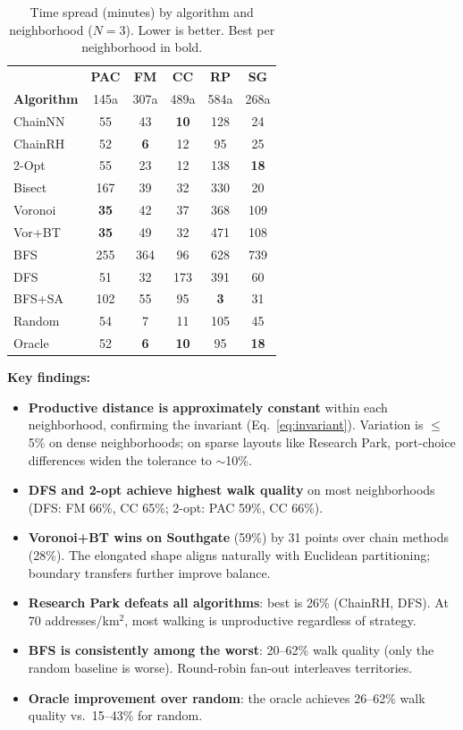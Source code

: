 \documentclass[conference]{IEEEtran}
\begin{document}
\begin{table}[htbp]
\caption{Time spread (minutes) by algorithm and neighborhood ($N=3$). Lower is better. Best per neighborhood in bold.}
\label{tab:spread-table}
\begin{center}
\begin{tabular}{l ccccc}
\toprule
 & \textbf{PAC} & \textbf{FM} & \textbf{CC} & \textbf{RP} & \textbf{SG} \\
\textbf{Algorithm} & 145a & 307a & 489a & 584a & 268a \\
\midrule
ChainNN  & 55 & 43 & \textbf{10} & 128 & 24 \\
ChainRH  & 52 & \textbf{6} & 12 & 95 & 25 \\
2-Opt    & 55 & 23 & 12 & 138 & \textbf{18} \\
Bisect   & 167 & 39 & 32 & 330 & 20 \\
Voronoi  & \textbf{35} & 42 & 37 & 368 & 109 \\
Vor+BT   & \textbf{35} & 49 & 32 & 471 & 108 \\
BFS      & 255 & 364 & 96 & 628 & 739 \\
DFS      & 51 & 32 & 173 & 391 & 60 \\
BFS+SA   & 102 & 55 & 95 & \textbf{3} & 31 \\
Random   & 54 & 7 & 11 & 105 & 45 \\
\midrule
Oracle   & 52 & \textbf{6} & \textbf{10} & 95 & \textbf{18} \\
\bottomrule
\end{tabular}
\end{center}
\end{table}

\textbf{Key findings:}
\begin{itemize}
\item \textbf{Productive distance is approximately constant} within each neighborhood, confirming the invariant (Eq.~\ref{eq:invariant}). Variation is $\leq$5\% on dense neighborhoods; on sparse layouts like Research Park, port-choice differences widen the tolerance to $\sim$10\%.
\item \textbf{DFS and 2-opt achieve highest walk quality} on most neighborhoods (DFS: FM 66\%, CC 65\%; 2-opt: PAC 59\%, CC 66\%).
\item \textbf{Voronoi+BT wins on Southgate} (59\%) by 31 points over chain methods (28\%). The elongated shape aligns naturally with Euclidean partitioning; boundary transfers further improve balance.
\item \textbf{Research Park defeats all algorithms}: best is 26\% (ChainRH, DFS). At 70 addresses/km$^2$, most walking is unproductive regardless of strategy.
\item \textbf{BFS is consistently among the worst}: 20--62\% walk quality (only the random baseline is worse). Round-robin fan-out interleaves territories.
\item \textbf{Oracle improvement over random}: the oracle achieves 26--62\% walk quality vs.\ 15--43\% for random.
\end{itemize}
\end{document}
